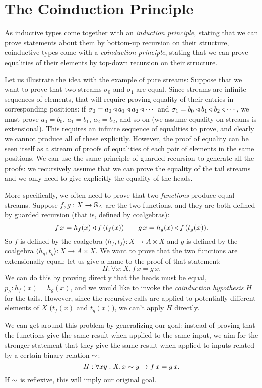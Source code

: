 \section{The Coinduction Principle}

As inductive types come together with an {\em induction principle}, stating that we can prove statements about them by bottom-up recursion on their structure, coinductive types come with a {\em coinduction principle}, stating that we can prove equalities of their elements by top-down recursion on their structure.

Let us illustrate the idea with the example of pure streams:
Suppose that we want to prove that two streams $\sigma_0$ and $\sigma_1$ are equal.
Since streams are infinite sequences of elements, that will require proving equality of their entries in corresponding positions: if $\sigma_0 = a_0\triangleleft a_1\triangleleft a_2\triangleleft \cdots$ and  $\sigma_1 = b_0\triangleleft b_1\triangleleft b_2\triangleleft \cdots$, we must prove $a_0 = b_0$, $a_1 = b_1$, $a_2=b_2$, and so on (we assume equality on streams is extensional).
This requires an infinite sequence of equalities to prove, and clearly we cannot produce all of these explicitly.
However, the proof of equality can be seen itself as a stream of proofs of equalities of each pair of elements in the same positions.
We can use the same principle of guarded recursion to generate all the proofs: we recursively assume that we can prove the equality of the tail streams and we only need to give explicitly the equality of the heads.

More specifically, we often need to prove that two \emph{functions} produce equal streams.
Suppose $f,g:X \rightarrow \mathbb{S}_{A}$ are the two functions, and they are both defined by guarded recursion (that is, defined by coalgebras):
$$
f\,x = h_f(x) \triangleleft f\,(t_f(x)) \qquad g\,x = h_g(x) \triangleleft f\,(t_g(x)).
$$
So $f$ is defined by the coalgebra $\langle h_f, t_f\rangle : X \rightarrow A\times X$ and $g$ is defined by the coalgebra $\langle h_g, t_g\rangle : X \rightarrow A\times X$.
We want to prove that the two functions are extensionally equal; let us give a name to the proof of that statement:
$$
H: \forall x:X, f\,x = g\,x.
$$
We can do this by proving directly that the heads must be equal, $p_h:h_f(x) = h_g(x)$, and we would like to invoke the {\em coinduction hypothesis} $H$ for the tails.
However, since the recursive calls are applied to potentially different elements of $X$ ($t_f(x)$ and $t_g(x)$), we can't apply $H$ directly.

We can get around this problem by generalizing our goal: instead of proving that the functions give the same result when applied to the same input, we aim for the stronger statement that they give the same result when applied to inputs related by a certain binary relation $\sim$:
$$
H: \forall x y:X, x\sim y \rightarrow f\,x = g\,x.
$$
If $\sim$ is reflexive, this will imply our original goal.

